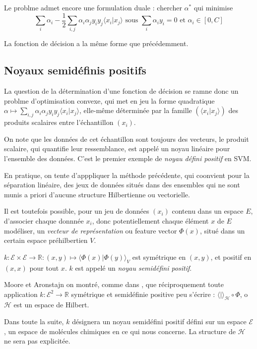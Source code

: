\par
Le problme admet encore une formulation duale : chercher $\alpha^{\ast}$ qui minimise
\[\sum\limits_i\alpha_i-\frac{1}{2}\sum\limits_{i,j}\alpha_i\alpha_jy_iy_j\langle x_i|x_j\rangle%
\text{ sous }\sum_i\alpha_iy_i=0\text{ et }\alpha_i\in[0,C]\]

\par
La fonction de d\'ecision a la m\^eme forme que pr\'ec\'edemment.

\subsection{Noyaux semid\'efinis positifs}

La question de la d\'etermination d'une fonction de d\'ecision se ramne donc  un problme d'optimisation convexe, %
qui met en jeu la forme quadratique $\alpha \mapsto\sum\limits_{i,j}\alpha_i\alpha_j y_iy_j\langle x_i|x_j\rangle$, %
elle-m\^eme d\'etermin\'ee par la famille $(\langle x_i|x_j\rangle)$ des produits scalaires entre l'\'echantillon $(x_i)$.

\par
On note que les donn\'ees de cet \'echantillon sont toujours des vecteurs, le produit scalaire, qui quantifie leur ressemblance, %
est appel\'e un noyau lin\'eaire pour l'ensemble des donn\'ees. C'est le premier exemple de \emph{noyau d\'efini positif} en SVM.

\par
En pratique, on tente d'apppliquer la m\'ethode pr\'ec\'edente, qui coonvient pour la s\'eparation lin\'eaire, %
 des jeux de donn\'ees situ\'es dans des ensembles qui ne sont munis a priori d'aucune structure Hilbertienne ou vectorielle.

\par
Il est toutefois possible, pour un jeu de donn\'ees $(x_i)$ contenu dans un espace $E$, d'associer  chaque donnn\'ee $x_i$, %
donc potentiellement  chaque \'el\'ement $x$ de $E$  mod\'eliser, un \emph{vecteur de repr\'esentation} %
ou \og{} feature vector\fg{} $\Phi (x)$, situ\'e dans un certain espace pr\'ehilbertien $V$.

\par
$k:\mathcal{E}\times \mathcal{E}\rightarrow \mathbb{R}:(x,y)\mapsto\langle\Phi (x)|\Phi (y)\rangle_{V}$ est sym\'etrique en $(x,y)$, et positif en $(x,x)$ pour tout $x$. %
$k$ est appel\'e un \emph{noyau semid\'efini positif}.

\par
Moore et Aronstajn on montr\'e, comme dans \cite{Ar}, que r\'eciproquement %
toute application $k:\mathcal{E}^2\rightarrow \mathbb{R}$ sym\'etrique et semid\'efinie positive peu s'\'ecrire : %
$\langle |\rangle_{\mathcal{H}}\circ\Phi$, o $\mathcal{H}$ est un espace de Hilbert.%

\ligneinter
Dans toute la suite, $k$ d\'esignera un noyau semid\'efini positif d\'efini sur un espace $\mathcal{E}$, un espace de mol\'ecules chimiques en ce qui nous concerne. %
La structure de $\mathcal{H}$ ne sera pas explicit\'ee.
